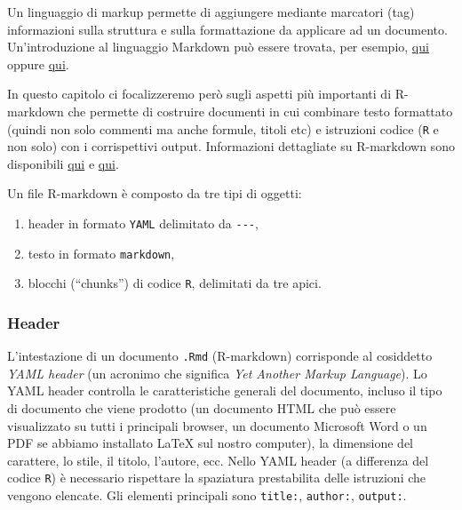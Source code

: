 \documentclass[
]{memoir}
\providecommand{\tightlist}{%
  \setlength{\itemsep}{0pt}\setlength{\parskip}{0pt}}
\theoremstyle{definition}
\theoremstyle{definition}
\theoremstyle{definition}
\theoremstyle{definition}
\theoremstyle{remark}
\begin{document}
Un linguaggio di markup permette di aggiungere mediante marcatori (tag) informazioni sulla struttura e sulla formattazione da applicare ad un documento. Un'introduzione al linguaggio Markdown può essere trovata, per esempio, \href{https://rmarkdown.rstudio.com/authoring_pandoc_markdown.html}{qui} oppure \href{https://experienceleague.adobe.com/docs/contributor/contributor-guide/writing-essentials/markdown.html?lang=it\#estensioni-personalizzate-markdown}{qui}.

In questo capitolo ci focalizzeremo però sugli aspetti più importanti di R-markdown che permette di costruire documenti in cui combinare testo formattato (quindi non solo commenti ma anche formule, titoli etc) e istruzioni codice (\texttt{R} e non solo) con i corrispettivi output. Informazioni dettagliate su R-markdown sono disponibili \href{https://bookdown.org/yihui/rmarkdown/}{qui} e \href{https://bookdown.org/yihui/rmarkdown-cookbook/}{qui}.

Un file R-markdown è composto da tre tipi di oggetti:

\begin{enumerate}
\def\labelenumi{\arabic{enumi}.}
\tightlist
\item
  header in formato \texttt{YAML} delimitato da \texttt{-\/-\/-},
\item
  testo in formato \texttt{markdown},
\item
  blocchi (``chunks'') di codice \texttt{R}, delimitati da tre apici.
\end{enumerate}

\hypertarget{header}{%
\subsubsection{Header}\label{header}}

L'intestazione di un documento \texttt{.Rmd} (R-markdown) corrisponde al cosiddetto \emph{YAML header} (un acronimo che significa \emph{Yet Another Markup Language}). Lo YAML header controlla le caratteristiche generali del documento, incluso il tipo di documento che viene prodotto (un documento HTML che può essere visualizzato su tutti i principali browser, un documento Microsoft Word o un PDF se abbiamo installato LaTeX sul nostro computer), la dimensione del carattere, lo stile, il titolo, l'autore, ecc. Nello YAML header (a differenza del codice \texttt{R}) è necessario rispettare la spaziatura prestabilita delle istruzioni che vengono elencate. Gli elementi principali sono \texttt{title:}, \texttt{author:}, \texttt{output:}.
\end{document}
